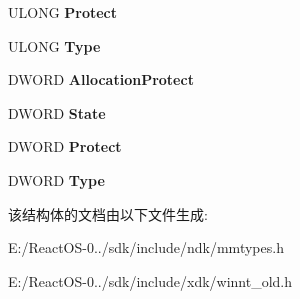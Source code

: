 \begin{DoxyCompactItemize}
U\+L\+O\+NG {\bfseries Protect}
\item 
\mbox{\label{struct___m_e_m_o_r_y___b_a_s_i_c___i_n_f_o_r_m_a_t_i_o_n_aaa11700ad6987aa20c8c7e6023e773fb}} 
U\+L\+O\+NG {\bfseries Type}
\item 
\mbox{\label{struct___m_e_m_o_r_y___b_a_s_i_c___i_n_f_o_r_m_a_t_i_o_n_aeb5d5acc5678d892b0b08123c437a88e}} 
D\+W\+O\+RD {\bfseries Allocation\+Protect}
\item 
\mbox{\label{struct___m_e_m_o_r_y___b_a_s_i_c___i_n_f_o_r_m_a_t_i_o_n_a53f0ab350e954b0d250355e387d67342}} 
D\+W\+O\+RD {\bfseries State}
\item 
\mbox{\label{struct___m_e_m_o_r_y___b_a_s_i_c___i_n_f_o_r_m_a_t_i_o_n_ac8d291472a81ff61c5a7c7df50e2377c}} 
D\+W\+O\+RD {\bfseries Protect}
\item 
\mbox{\label{struct___m_e_m_o_r_y___b_a_s_i_c___i_n_f_o_r_m_a_t_i_o_n_ae70bafdfc9f045370e2195afb95ff999}} 
D\+W\+O\+RD {\bfseries Type}
\end{DoxyCompactItemize}


该结构体的文档由以下文件生成\+:\begin{DoxyCompactItemize}
\item 
E\+:/\+React\+O\+S-\/0../sdk/include/ndk/mmtypes.\+h\item 
E\+:/\+React\+O\+S-\/0../sdk/include/xdk/winnt\+\_\+old.\+h\end{DoxyCompactItemize}
